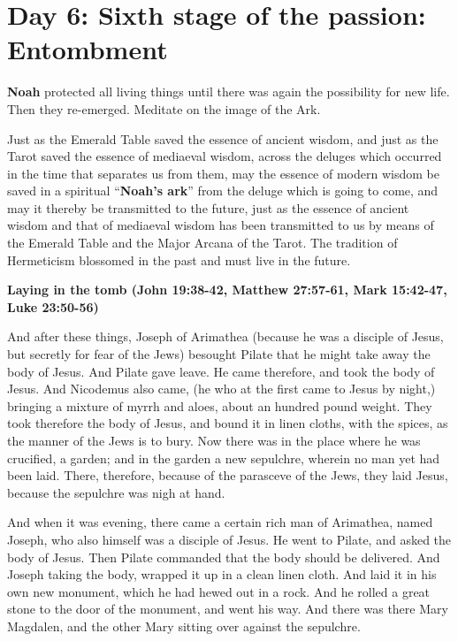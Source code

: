 \section{Day 6: Sixth stage of the passion: Entombment}

\textbf{Noah} protected all living things until there was again the possibility for new life. Then they re-emerged. Meditate on the image of the Ark.

\begin{quotex}
Just as the Emerald Table saved the essence of ancient wisdom, and just as the Tarot saved the essence of mediaeval wisdom, across the deluges which occurred in the time that separates us from them, may the essence of modern wisdom be saved in a spiritual ``\textbf{Noah's ark}'' from the deluge which is going to come, and may it thereby be transmitted to the future, just as the essence of ancient wisdom and that of mediaeval wisdom has been transmitted to us by means of the Emerald Table and the Major Arcana of the Tarot. The tradition of Hermeticism blossomed in the past and must live in the future. 

\end{quotex}

\textbf{Laying in the tomb (John 19:38-42, Matthew 27:57-61, Mark 15:42-47, Luke 23:50-56)}

And after these things, Joseph of Arimathea (because he was a disciple of Jesus, but secretly for fear of the Jews) besought Pilate that he might take away the body of Jesus. And Pilate gave leave. He came therefore, and took the body of Jesus. And Nicodemus also came, (he who at the first came to Jesus by night,) bringing a mixture of myrrh and aloes, about an hundred pound weight. They took therefore the body of Jesus, and bound it in linen cloths, with the spices, as the manner of the Jews is to bury. Now there was in the place where he was crucified, a garden; and in the garden a new sepulchre, wherein no man yet had been laid. There, therefore, because of the parasceve of the Jews, they laid Jesus, because the sepulchre was nigh at hand.

And when it was evening, there came a certain rich man of Arimathea, named Joseph, who also himself was a disciple of Jesus. He went to Pilate, and asked the body of Jesus. Then Pilate commanded that the body should be delivered. And Joseph taking the body, wrapped it up in a clean linen cloth. And laid it in his own new monument, which he had hewed out in a rock. And he rolled a great stone to the door of the monument, and went his way. And there was there Mary Magdalen, and the other Mary sitting over against the sepulchre.

